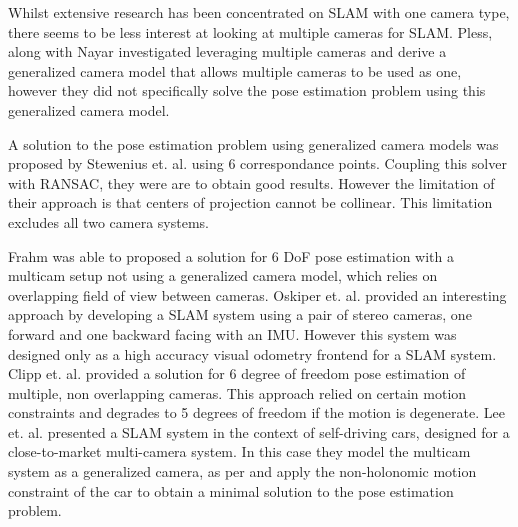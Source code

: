 
Whilst extensive research has been concentrated on SLAM with one camera type, there seems to be less interest at looking at multiple cameras for SLAM.  Pless\cite{pless_03}, along with Nayar\cite{nayar_01} investigated leveraging multiple cameras and derive a generalized camera model that allows multiple cameras to be used as one, however they did not specifically solve the pose estimation problem using this generalized camera model.  

A solution to the pose estimation problem using generalized camera models was proposed by Stewenius et. al. \cite{stewenius_05} using 6 correspondance points.  Coupling this solver with RANSAC, they were are to obtain good results.  However the limitation of their approach is that centers of projection cannot be collinear. This limitation excludes all two camera systems.

Frahm\cite{frahm_04} was able to proposed a solution for 6 DoF pose estimation with a multicam setup not using a generalized camera model, which relies on overlapping field of view between cameras. Oskiper et. al.\cite{oskiper_07} provided an interesting approach by developing a SLAM system using a pair of stereo cameras, one forward and one backward facing with an IMU.  However this system was designed only as a high accuracy visual odometry frontend for a SLAM system.  Clipp et. al.\cite{clipp_09} provided a solution for 6 degree of freedom pose estimation of multiple, non overlapping cameras.  This approach relied on certain motion constraints and degrades to 5 degrees of freedom if the motion is degenerate.  Lee et. al.\cite{lee_13} presented a SLAM system in the context of self-driving cars, designed for a close-to-market multi-camera system.  In this case they model the multicam system as a generalized camera, as per \cite{pless_03} and apply the non-holonomic motion constraint of the car to obtain a minimal solution to the pose estimation problem.
